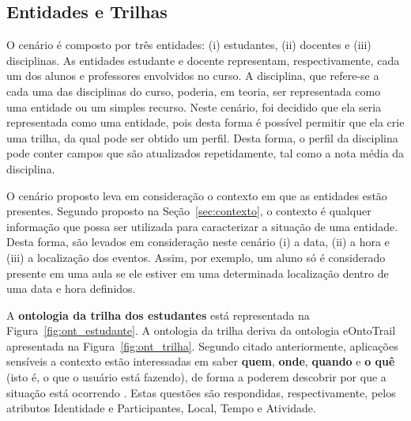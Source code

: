 \subsection{Entidades e Trilhas}
\label{sec:cen1_trilhas}

O cenário é composto por três entidades: (i) estudantes, (ii) docentes e (iii) disciplinas. As entidades estudante e docente representam, respectivamente, cada um dos alunos e professores envolvidos no curso. A disciplina, que refere-se a cada uma das disciplinas do curso, poderia, em teoria, ser representada como uma entidade ou um simples recurso. Neste cenário, foi decidido que ela seria representada como uma entidade, pois desta forma é possível permitir que ela crie uma trilha, da qual pode ser obtido um perfil. Desta forma, o perfil da disciplina pode conter campos que são atualizados repetidamente, tal como a nota média da disciplina.

O cenário proposto leva em consideração o contexto em que as entidades estão presentes. Segundo proposto na Seção~\ref{sec:contexto}, o contexto é qualquer informação que possa ser utilizada para caracterizar a situação de uma entidade. Desta forma, são levados em consideração neste cenário (i) a data, (ii) a hora e (iii) a localização dos eventos. Assim, por exemplo, um aluno só é considerado presente em uma aula se ele estiver em uma determinada localização dentro de uma data e hora definidos.

A {\bf ontologia da trilha dos estudantes} está representada na Figura~\ref{fig:ont_estudante}. A ontologia da trilha deriva da ontologia eOntoTrail apresentada na Figura~\ref{fig:ont_trilha}. Segundo citado anteriormente, aplicações sensíveis a contexto estão interessadas em saber {\bf quem}, {\bf onde}, {\bf quando} e {\bf o quê} (isto é, o que o usuário está fazendo), de forma a poderem descobrir por que a situação está ocorrendo . Estas questões são respondidas, respectivamente, pelos atributos Identidade e Participantes, Local, Tempo e Atividade.

